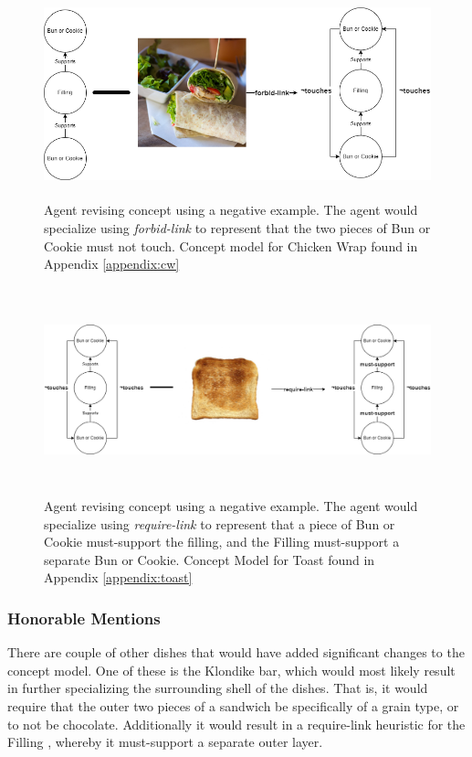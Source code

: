 \begin{figure}[H]
	\centering
	\includegraphics[height=6cm]{Figures/step2.png}
	\caption{Agent revising concept using a negative example. The agent would specialize using \textit{forbid-link} to represent that the two pieces of Bun or Cookie must not touch. Concept model for Chicken Wrap found in Appendix \ref{appendix:cw}}
	\label{fig:step2}
\end{figure}

\begin{figure}[H]
	\centering
	\includegraphics[height=6cm]{Figures/step3.png}
	\caption{Agent revising concept using a negative example. The agent would specialize using \textit{require-link} to represent that a piece of Bun or Cookie must-support the filling, and the Filling must-support a separate Bun or Cookie. Concept Model for Toast found in Appendix \ref{appendix:toast}}
	\label{fig:step3}
\end{figure}
\subsubsection{Honorable Mentions}
There are couple of other dishes that would have added significant changes to the concept model. One of these is the Klondike bar, which would most likely result in further specializing the surrounding shell of the dishes. That is, it would require that the outer two pieces of a sandwich be specifically of a grain type, or to not be chocolate. Additionally it would result in a require-link heuristic for the Filling , whereby it must-support a separate outer layer.

